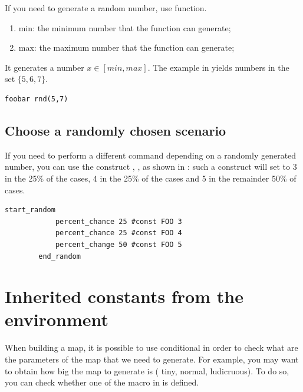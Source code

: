 \begin{appendices}
    If you need to generate a random number, use  function.
    \begin{enumerate}
        \item min: the minimum number that the function can generate;
        \item max: the maximum number that the function can generate;
    \end{enumerate}
    It generates a number $x \in [min,max]$. The example in  yields numbers in the set $\{5,6,7\}$.

    \begin{lstlisting}[language=rms,label=rms:rnd]
        foobar rnd(5,7)
    \end{lstlisting}

    \subsection{Choose a randomly chosen scenario}

    If you need to perform a different command depending on a randomly generated number, you can use the construct , , as shown in : such a construct will set  to 3 in the 25\% of the cases, 4 in the 25\% of the cases and 5 in the remainder 50\% of cases.

    \begin{lstlisting}[language=rms,label=rms:startrandom]
        start_random
            percent_chance 25 #const FOO 3
            percent_chance 25 #const FOO 4
            percent_change 50 #const FOO 5
        end_random
    \end{lstlisting}

    \section{Inherited constants from the environment}

    When building a map, it is possible to use conditional in order to check what are the parameters of the map that we need to generate. For example, you may want to obtain how big the map to generate is (\eg{} tiny, normal, ludicruous). To do so, you can check whether one of the macro in  is defined.


\end{appendices}

